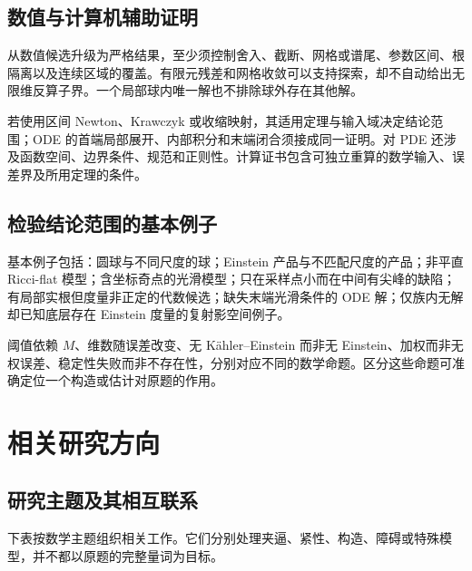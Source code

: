 \documentclass[11pt,a4paper]{article}
\theoremstyle{definition}
\begin{document}
\subsection{数值与计算机辅助证明}

从数值候选升级为严格结果，至少须控制舍入、截断、网格或谱尾、参数区间、根隔离以及连续区域的覆盖。有限元残差和网格收敛可以支持探索，却不自动给出无限维反算子界。一个局部球内唯一解也不排除球外存在其他解。

若使用区间 Newton、Krawczyk 或收缩映射，其适用定理与输入域决定结论范围；ODE 的首端局部展开、内部积分和末端闭合须接成同一证明。对 PDE 还涉及函数空间、边界条件、规范和正则性。计算证书包含可独立重算的数学输入、误差界及所用定理的条件。

\subsection{检验结论范围的基本例子}

基本例子包括：圆球与不同尺度的球；Einstein 产品与不匹配尺度的产品；非平直 Ricci-flat 模型；含坐标奇点的光滑模型；只在采样点小而在中间有尖峰的缺陷；有局部实根但度量非正定的代数候选；缺失末端光滑条件的 ODE 解；仅族内无解却已知底层存在 Einstein 度量的复射影空间例子。

阈值依赖 $M$、维数随误差改变、无 Kähler--Einstein 而非无 Einstein、加权而非无权误差、稳定性失败而非不存在性，分别对应不同的数学命题。区分这些命题可准确定位一个构造或估计对原题的作用。

\section{相关研究方向}

\subsection{研究主题及其相互联系}

下表按数学主题组织相关工作。它们分别处理夹逼、紧性、构造、障碍或特殊模型，并不都以原题的完整量词为目标。
\end{document}
